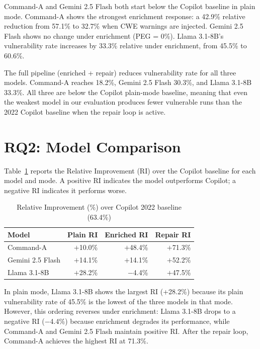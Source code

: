 \documentclass[12pt,a4paper]{report}
\begin{document}
Command-A and Gemini 2.5 Flash both start below the Copilot baseline in plain
mode. Command-A shows the strongest enrichment response: a 42.9\% relative
reduction from 57.1\% to 32.7\% when CWE warnings are injected. Gemini 2.5
Flash shows no change under enrichment (PEG = 0\%). Llama 3.1-8B's vulnerability
rate increases by 33.3\% relative under enrichment, from 45.5\% to 60.6\%.

The full pipeline (enriched + repair) reduces vulnerability rate for all three
models. Command-A reaches 18.2\%, Gemini 2.5 Flash 30.3\%, and Llama 3.1-8B
33.3\%. All three are below the Copilot plain-mode baseline, meaning that even
the weakest model in our evaluation produces fewer vulnerable runs than the 2022
Copilot baseline when the repair loop is active.

\section{RQ2: Model Comparison}
\label{sec:rq2}

Table~\ref{tab:ri} reports the Relative Improvement (RI) over the Copilot
baseline for each model and mode. A positive RI indicates the model outperforms
Copilot; a negative RI indicates it performs worse.

\begin{table}[H]
\centering
\caption{Relative Improvement (\%) over Copilot 2022 baseline (63.4\%)}
\label{tab:ri}
\renewcommand{\arraystretch}{1.3}
\begin{tabular}{@{}lrrr@{}}
\toprule
\textbf{Model} & \textbf{Plain RI} & \textbf{Enriched RI} & \textbf{Repair RI} \\
\midrule
Command-A         & $+$10.0\% & $+$48.4\% & $+$71.3\% \\
Gemini 2.5 Flash  & $+$14.1\% & $+$14.1\% & $+$52.2\% \\
Llama 3.1-8B      & $+$28.2\% & $-$4.4\%  & $+$47.5\% \\
\bottomrule
\end{tabular}
\end{table}

In plain mode, Llama 3.1-8B shows the largest RI (+28.2\%) because its plain
vulnerability rate of 45.5\% is the lowest of the three models in that mode.
However, this ordering reverses under enrichment: Llama 3.1-8B drops to a
negative RI ($-$4.4\%) because enrichment degrades its performance, while
Command-A and Gemini 2.5 Flash maintain positive RI. After the repair loop,
Command-A achieves the highest RI at 71.3\%.
\end{document}
